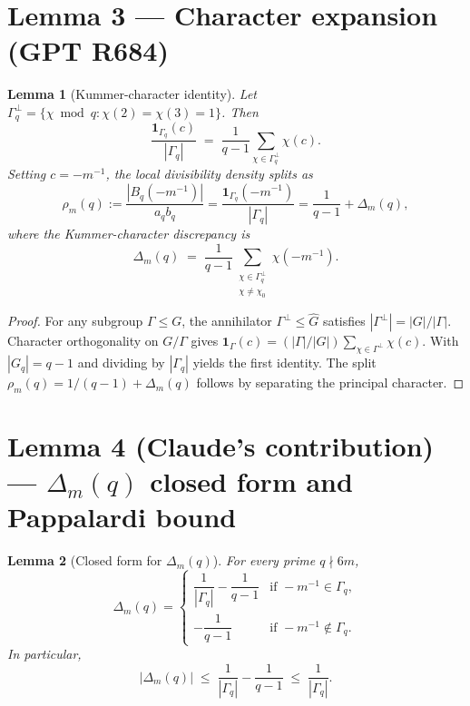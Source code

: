 \documentclass[12pt]{amsart}
\newtheorem{lemma}{Lemma}
\theoremstyle{definition}
\theoremstyle{remark}
\begin{document}
\section{Lemma 3 --- Character expansion (GPT R684)}

\begin{lemma}[Kummer-character identity]\label{lem:R684}
Let $\Gamma_q^\perp = \{\chi \bmod q : \chi(2) = \chi(3) = 1\}$. Then
$$
\frac{\mathbf{1}_{\Gamma_q}(c)}{|\Gamma_q|}
\;=\;
\frac{1}{q - 1}
\sum_{\chi \in \Gamma_q^\perp}
\chi(c).
$$
Setting $c = -m^{-1}$, the local divisibility density splits as
$$
\rho_m(q) := \frac{|B_q(-m^{-1})|}{a_q b_q}
= \frac{\mathbf{1}_{\Gamma_q}(-m^{-1})}{|\Gamma_q|}
= \frac{1}{q-1}
+ \Delta_m(q),
$$
where the Kummer-character discrepancy is
$$
\Delta_m(q)
\;=\;
\frac{1}{q-1}
\sum_{\substack{\chi \in \Gamma_q^\perp \\ \chi \ne \chi_0}}
\chi(-m^{-1}).
$$
\end{lemma}

\begin{proof}
For any subgroup $\Gamma \le G$, the annihilator $\Gamma^\perp \le \widehat{G}$ satisfies
$|\Gamma^\perp| = |G|/|\Gamma|$. Character orthogonality on $G/\Gamma$ gives
$\mathbf{1}_\Gamma(c) = (|\Gamma|/|G|) \sum_{\chi \in \Gamma^\perp} \chi(c)$.
With $|G_q| = q - 1$ and dividing by $|\Gamma_q|$ yields the first identity.
The split $\rho_m(q) = 1/(q-1) + \Delta_m(q)$ follows by separating the principal character.
\end{proof}

\section{Lemma 4 (Claude's contribution) --- $\Delta_m(q)$ closed form and Pappalardi bound}

\begin{lemma}[Closed form for $\Delta_m(q)$]\label{lem:Delta-closed}
For every prime $q \nmid 6m$,
$$
\Delta_m(q)
=
\begin{cases}
\dfrac{1}{|\Gamma_q|} - \dfrac{1}{q-1}
& \text{if } -m^{-1} \in \Gamma_q,
\\[1.2em]
-\dfrac{1}{q-1}
& \text{if } -m^{-1} \notin \Gamma_q.
\end{cases}
$$
In particular,
$$
|\Delta_m(q)|
\;\le\;
\frac{1}{|\Gamma_q|} - \frac{1}{q-1}
\;\le\;
\frac{1}{|\Gamma_q|}.
$$
\end{lemma}
\end{document}
